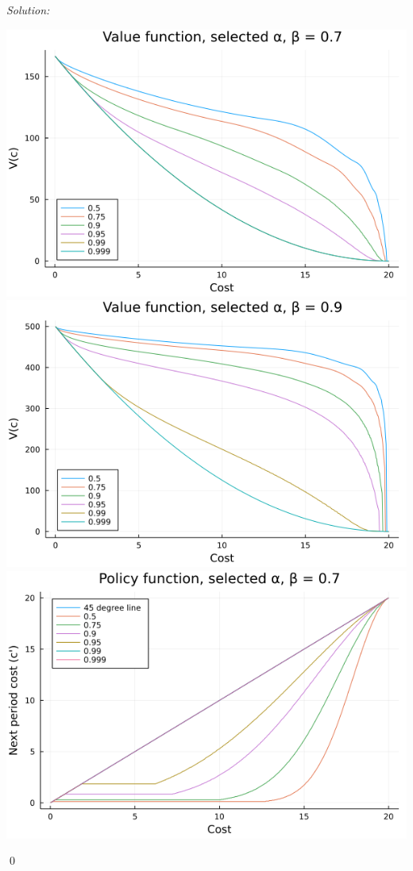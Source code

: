 \documentclass[12pt]{article}
\newenvironment{sol}
           {\emph{Solution:}
           }
           {
           \qed
           }
\begin{document}
\begin{sol}
        \begin{center}
            \includegraphics[scale=0.6]{vfplotbeta=7}
            \includegraphics[scale=0.6]{vfplotbeta=9}
            \includegraphics[scale=0.6]{pfplotbeta=7}

\end{center}
\end{sol}
\end{document}
